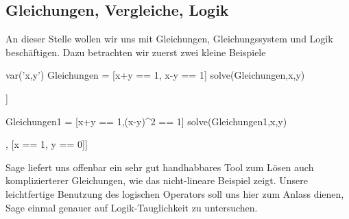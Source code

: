 \documentclass[fontsize=12pt,paper=a4,twoside,bibtotoc,idxtotoc,
liststotoc,pagesize,BCOR1.2cm,DIV15,chapterprefix,pagesize=pdftex]{scrbook}
\theoremstyle{plain}
\theoremstyle{definition}
\theoremstyle{remark}
\begin{document}
\subsection{Gleichungen, Vergleiche, Logik}
An dieser Stelle wollen wir uns mit Gleichungen, Gleichungssystem und Logik beschäftigen. Dazu betrachten wir zuerst zwei kleine Beispiele 
\begin{sagein}
var('x,y')
Gleichungen = [x+y == 1, x-y == 1]
solve(Gleichungen,x,y)
\end{sagein}
\begin{sage}
[[x == 1, y == 0]]
\end{sage}
\begin{sagein}
Gleichungen1 = [x+y == 1,(x-y)^2 == 1]
solve(Gleichungen1,x,y)
\end{sagein}
\begin{sage}
[[x == 0, y == 1], [x == 1, y == 0]]
\end{sage}
Sage liefert uns offenbar ein sehr gut handhabbares Tool zum Lösen auch komplizierterer Gleichungen, wie das nicht-lineare Beispiel zeigt.
Unsere leichtfertige Benutzung des logischen Operators {\color{blue} \verb == } soll uns hier zum Anlass dienen, Sage einmal genauer auf 
Logik-Tauglichkeit zu untersuchen.
\end{document}
